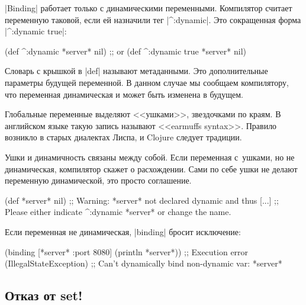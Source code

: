 
\label{dynamic-vars}

\spverb|Binding| работает только с динамическими переменными. Компилятор считает
переменную таковой, если ей назначили тег \spverb|^:dynamic|. Это сокращенная
форма \spverb|^{:dynamic true}|:

\begin{english}
  \begin{clojure}
(def ^:dynamic *server* nil)
;; or
(def ^{:dynamic true} *server* nil)
  \end{clojure}
\end{english}

Словарь с крышкой в \spverb|def| называют метаданными. Это дополнительные
параметры будущей переменной. В данном случае мы сообщаем компилятору, что
переменная динамическая и может быть изменена в будущем.

Глобальные переменные выделяют <<ушками>>, звездочками по краям. В
английском языке такую запись называют <<earmuffs syntax>>. Правило возникло в
старых диалектах Лиспа, и Clojure следует традиции.


Ушки и динамичность связаны между собой. Если переменная с~ушками, но не
динамическая, компилятор скажет о расхождении. Сами по себе ушки не делают
переменную динамической, это просто соглашение.

\begin{english}
  \begin{clojure}
(def *server* nil)
;; Warning: *server* not declared dynamic and thus [...]
;; Please either indicate ^:dynamic *server* or change the name.
  \end{clojure}
\end{english}

\noindent
Если переменная не динамическая, \spverb|binding| бросит исключение:

\begin{english}
  \begin{clojure}
(binding [*server* {:port 8080}]
  (println *server*))
;; Execution error (IllegalStateException)
;; Can't dynamically bind non-dynamic var: *server*
  \end{clojure}
\end{english}

\subsection{Отказ от set!}

